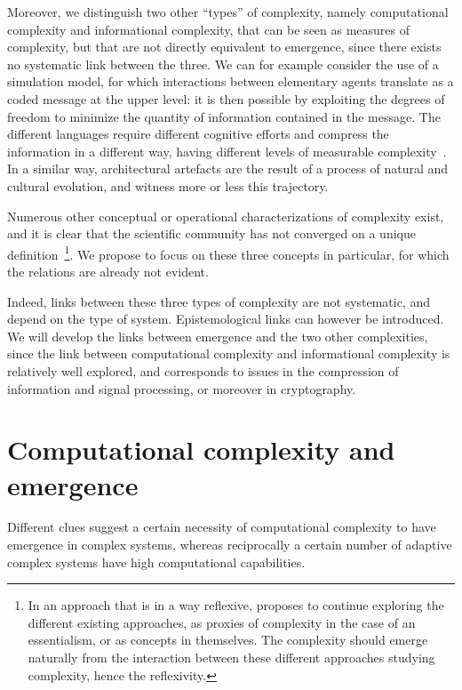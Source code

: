 Moreover, we distinguish two other ``types'' of complexity, namely computational complexity and informational complexity, that can be seen as measures of complexity, but that are not directly equivalent to emergence, since there exists no systematic link between the three. We can for example consider the use of a simulation model, for which interactions between elementary agents translate as a coded message at the upper level: it is then possible by exploiting the degrees of freedom to minimize the quantity of information contained in the message. The different languages require different cognitive efforts and compress the information in a different way, having different levels of measurable complexity~\cite{febres2013complexity}. In a similar way, architectural artefacts are the result of a process of natural and cultural evolution, and witness more or less this trajectory.


Numerous other conceptual or operational characterizations of complexity exist, and it is clear that the scientific community has not converged on a unique definition~\cite{chu2008criteria}\footnote{In an approach that is in a way reflexive, \cite{chu2008criteria} proposes to continue exploring the different existing approaches, as proxies of complexity in the case of an essentialism, or as concepts in themselves. The complexity should emerge naturally from the interaction between these different approaches studying complexity, hence the reflexivity.}. We propose to focus on these three concepts in particular, for which the relations are already not evident.



Indeed, links between these three types of complexity are not systematic, and depend on the type of system. Epistemological links can however be introduced. We will develop the links between emergence and the two other complexities, since the link between computational complexity and informational complexity is relatively well explored, and corresponds to issues in the compression of information and signal processing, or moreover in cryptography.


\section{Computational complexity and emergence}

Different clues suggest a certain necessity of computational complexity to have emergence in complex systems, whereas reciprocally a certain number of adaptive complex systems have high computational capabilities.




